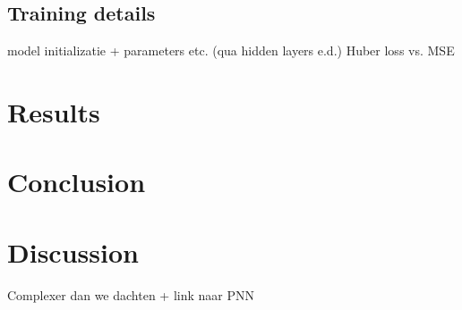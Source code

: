 \documentclass{article}
\begin{document}
\subsection{Training details}
model initializatie + parameters etc. (qua hidden layers e.d.)
Huber loss vs. MSE


\section{Results}


\section{Conclusion}


\section{Discussion}
Complexer dan we dachten + link naar PNN

\cite{*}


\end{document}
